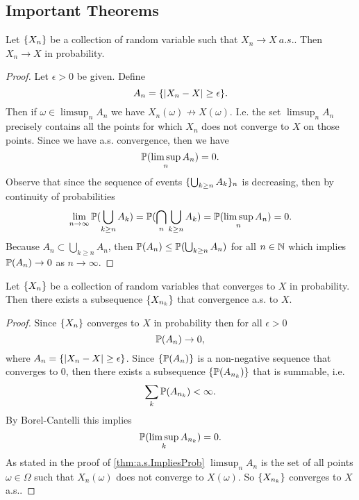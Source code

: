 \subsection{Important Theorems}
\begin{theorem}
	\label{thm:a.s.ImpliesProb}
	Let $ \{X_n\} $ be a collection of random variable such that $ X_n \to X\ a.s. $. Then $ X_n \to X $ in probability.
\end{theorem}
\begin{proof}
	Let $ \epsilon>0 $ be given. Define
	\[ A_n = \{|X_n - X| \geq \epsilon\}. \]
	Then if $ \omega \in \limsup_n A_n $ we have $ X_n(\omega) \not\to X(\omega) $. I.e. the set $ \limsup_n A_n $ precisely contains all the points for which $ X_n $ does not converge to $ X $ on those points. Since we have a.s. convergence, then we have
	\[ \mathbb{P}(\limsup_n A_n) = 0. \]
	Observe that since the sequence of events $ \{\bigcup_{k\geq n}A_k\}_n $ is decreasing, then by continuity of probabilities
	\[ \lim_{n\to\infty} \mathbb{P}(\bigcup_{k\geq n} A_k) = \mathbb{P}(\bigcap_n \bigcup_{k\geq n} A_k) = \mathbb{P}(\limsup_n A_n) = 0. \]
	Because $ A_n \subset \bigcup_{k\geq n} A_n $, then $ \mathbb{P}(A_n) \leq \mathbb{P}(\bigcup_{k\geq n} A_n) $ for all $ n\in \mathbb{N} $ which implies $ \mathbb{P}(A_n) \to 0 $ as $ n\to\infty $.
\end{proof}
\begin{theorem}
	Let $ \{X_n\} $ be a collection of random variables that converges to $ X $ in probability. Then there exists a subsequence $ \{X_{n_k}\} $ that convergence a.s. to $ X $.
\end{theorem}
\begin{proof}
	Since $ \{X_n\} $ converges to $ X $ in probability then for all $ \epsilon>0 $
	\[ \mathbb{P}(A_n) \to 0, \]
	where $ A_n = \{|X_n - X| \geq \epsilon\} $. Since $ \{\mathbb{P}(A_n)\} $ is a non-negative sequence that converges to $ 0 $, then there exists a subsequence $ \{\mathbb{P}(A_{n_k})\} $ that is summable, i.e.
	\[ \sum_k \mathbb{P}(A_{n_k}) <\infty. \]
	By Borel-Cantelli this implies
	\[ \mathbb{P}(\limsup_k A_{n_k}) = 0. \]
	As stated in the proof of \autoref{thm:a.s.ImpliesProb} $ \limsup_n A_n $ is the set of all points $ \omega \in \Omega $ such that $ X_n(\omega) $ does not converge to $ X(\omega) $. So $ \{X_{n_k}\} $ converges to $ X $ a.s..
\end{proof}

